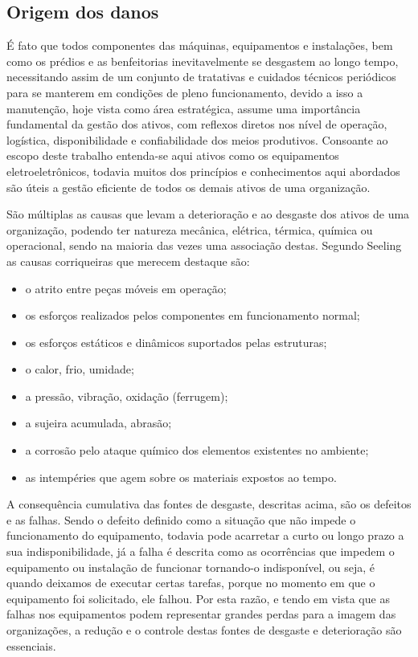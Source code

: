 \subsection{Origem dos danos}

É fato que todos componentes das máquinas, equipamentos e instalações, bem como os prédios e as benfeitorias inevitavelmente se desgastem ao longo tempo, necessitando assim de um conjunto de tratativas e cuidados técnicos periódicos para se manterem em condições de pleno funcionamento, devido a isso a manutenção, hoje vista como área estratégica, assume uma importância fundamental da gestão dos ativos, com reflexos diretos nos nível de operação, logística, disponibilidade e confiabilidade dos meios produtivos. Consoante ao escopo deste trabalho entenda-se aqui ativos como os equipamentos eletroeletrônicos, todavia muitos dos princípios e conhecimentos aqui abordados são úteis a gestão eficiente de todos os demais ativos de uma organização. 

São múltiplas as causas que levam a deterioração e ao desgaste dos ativos de uma organização, podendo ter natureza mecânica, elétrica, térmica, química ou operacional, sendo na maioria das vezes uma associação destas. Segundo Seeling \cite{seeling2000} as causas corriqueiras que merecem destaque são:

\begin{itemize}
	\item o atrito entre peças móveis em operação;
	\item os esforços realizados pelos componentes em funcionamento normal;
	\item os esforços estáticos e dinâmicos suportados pelas estruturas;
	\item o calor, frio, umidade;
	\item a pressão, vibração, oxidação (ferrugem);
	\item a sujeira acumulada, abrasão;
	\item a corrosão pelo ataque químico dos elementos existentes no ambiente;
	\item as intempéries que agem sobre os materiais expostos ao tempo.
\end{itemize}


A consequência cumulativa das fontes de desgaste, descritas acima, são os defeitos e as falhas. Sendo o defeito definido como a situação que não impede o funcionamento do equipamento, todavia pode acarretar a curto ou longo prazo a sua indisponibilidade, já a falha é descrita como as ocorrências que impedem o equipamento ou instalação de funcionar tornando-o indisponível, ou seja, é quando deixamos de executar certas tarefas, porque no momento em que o equipamento foi solicitado, ele falhou. Por esta razão, e tendo em vista que as falhas nos equipamentos podem representar grandes perdas para a imagem das organizações, a redução e o controle destas fontes de desgaste e deterioração são essenciais.

